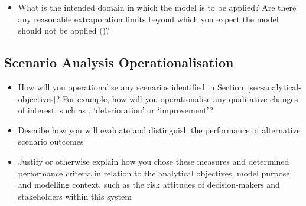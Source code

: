 \documentclass[
]{article}
\providecommand{\tightlist}{%
  \setlength{\itemsep}{0pt}\setlength{\parskip}{0pt}}
\begin{document}
\begin{tcolorbox}[enhanced jigsaw, opacitybacktitle=0.6, bottomrule=.15mm, leftrule=.75mm, rightrule=.15mm, colbacktitle=quarto-callout-caution-color!10!white, toprule=.15mm, titlerule=0mm, left=2mm, colframe=quarto-callout-caution-color-frame, breakable, title=\textcolor{quarto-callout-caution-color}{\faFire}\hspace{0.5em}{Preregistration Item}, opacityback=0, coltitle=black, bottomtitle=1mm, colback=white, toptitle=1mm, arc=.35mm]

\begin{itemize}
\tightlist
\item[$\square$]
  What is the intended domain in which the model is to be applied? Are
  there any reasonable extrapolation limits beyond which you expect the
  model should not be applied ()?
\end{itemize}

\end{tcolorbox}

\subsection{Scenario Analysis
Operationalisation}\label{scenario-analysis-operationalisation}

\begin{tcolorbox}[enhanced jigsaw, opacitybacktitle=0.6, bottomrule=.15mm, leftrule=.75mm, rightrule=.15mm, colbacktitle=quarto-callout-caution-color!10!white, toprule=.15mm, titlerule=0mm, left=2mm, colframe=quarto-callout-caution-color-frame, breakable, title=\textcolor{quarto-callout-caution-color}{\faFire}\hspace{0.5em}{Preregistration Item (delete as necessary)}, opacityback=0, coltitle=black, bottomtitle=1mm, colback=white, toptitle=1mm, arc=.35mm]

\begin{itemize}
\tightlist
\item[$\square$]
  How will you operationalise any scenarios identified in
  Section~\ref{sec-analytical-objectives}? For example, how will you
  operationalise any qualitative changes of interest, such as ‚
  `deterioration' or `improvement'?
\item[$\square$]
  Describe how you will evaluate and distinguish the performance of
  alternative scenario outcomes
\item[$\square$]
  Justify or otherwise explain how you chose these measures and
  determined performance criteria in relation to the analytical
  objectives, model purpose and modelling context, such as the risk
  attitudes of decision-makers and stakeholders within this system
\end{itemize}

\end{tcolorbox}
\end{document}
